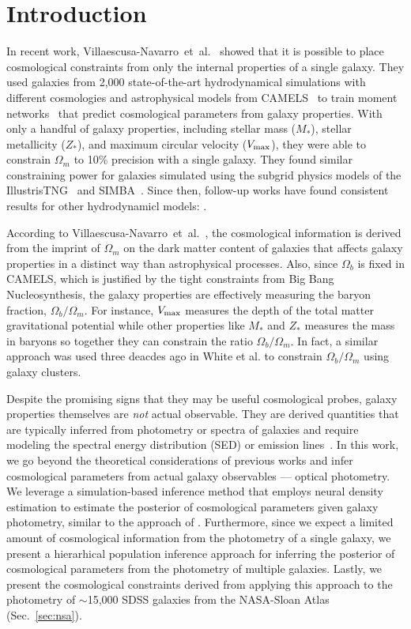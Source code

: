 \section{Introduction} \label{sec:intro} 
In recent work, Villaescusa-Navarro~et~al.~
showed that it is possible to place cosmological constraints from only the
internal properties of a single galaxy.
They used galaxies from 2,000 state-of-the-art hydrodynamical simulations with
different cosmologies and astrophysical models from
CAMELS~\citep{villaescusa-navarro2021, villaescusa-navarro2022a} to train
moment networks~\citep{jeffrey2020a} that predict cosmological parameters from
galaxy properties. 
With only a handful of galaxy properties, including stellar mass ($M_*$),
stellar metallicity ($Z_*$), and maximum circular velocity ($V_{\rm max}$),
they were able to constrain $\Omega_m$ to 10\% precision with a single galaxy.
They found similar constraining power for galaxies simulated using the subgrid
physics models of the IllustrisTNG~\citep{pillepich2018, weinberger2018} and
SIMBA~\citep{dave2019}. 
Since then, follow-up works have found consistent results for other
hydrodynamicl models: \citep{echeverri2023}. 


According to Villaescusa-Navarro~et~al.~, the
cosmological information is derived from the imprint of $\Omega_m$ on the dark
matter content of galaxies that affects galaxy properties in a distinct way
than astrophysical processes.
Also, since $\Omega_b$ is fixed in CAMELS, which is justified by the tight
constraints from Big Bang Nucleosynthesis, the galaxy properties are
effectively measuring the baryon fraction, $\Omega_b/\Omega_m$.
For instance, $V_{\rm max}$ measures the depth of the total matter
gravitational potential while other properties like $M_*$ and $Z_*$ measures
the mass in baryons so together they can constrain the ratio
$\Omega_b/\Omega_m$.
In fact, a similar approach was used three deacdes ago in 
White et al.  to constrain $\Omega_b/\Omega_m$  using galaxy
clusters. 

Despite the promising signs that they may be useful cosmological probes, galaxy
properties themselves are {\em not} actual observable.
They are derived quantities that are typically inferred from photometry or
spectra of galaxies and require modeling the spectral energy distribution
(SED) or emission lines~\citep{conroy2013}.
In this work, we go beyond the theoretical considerations of previous works and
infer cosmological parameters from actual galaxy observables --- optical  
photometry.  
We leverage a simulation-based inference method that employs neural density
estimation to estimate the posterior of cosmological parameters given galaxy
photometry, similar to the approach of \cite{hahn2022a}. 
Furthermore, since we expect a limited amount of cosmological information from
the photometry of a single galaxy, we present a hierarhical population
inference approach for inferring the posterior of cosmological parameters
from the photometry of multiple galaxies. 
Lastly, we present the cosmological constraints derived from applying this
approach to the photometry of $\sim$15,000 SDSS galaxies from the NASA-Sloan
Atlas (Sec.~\ref{sec:nsa}). 
